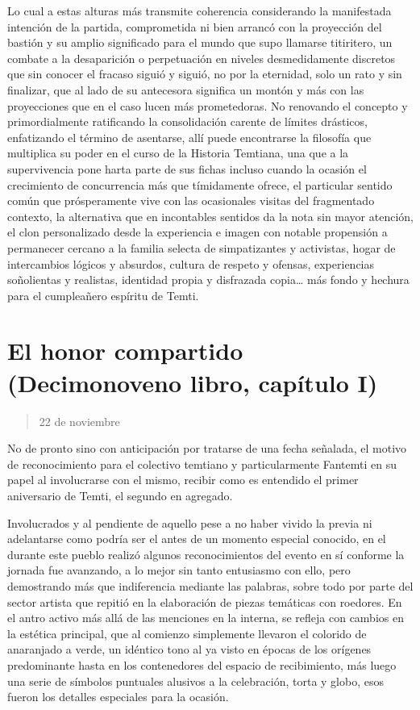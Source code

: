 \documentclass[
]{book}
\begin{document}
Lo cual a estas alturas más transmite coherencia considerando la manifestada intención de la partida, comprometida ni bien arrancó con la proyección del bastión y su amplio significado para el mundo que supo llamarse titiritero, un combate a la desaparición o perpetuación en niveles desmedidamente discretos que sin conocer el fracaso siguió y siguió, no por la eternidad, solo un rato y sin finalizar, que al lado de su antecesora significa un montón y más con las proyecciones que en el caso lucen más prometedoras. No renovando el concepto y primordialmente ratificando la consolidación carente de límites drásticos, enfatizando el término de asentarse, allí puede encontrarse la filosofía que multiplica su poder en el curso de la Historia Temtiana, una que a la supervivencia pone harta parte de sus fichas incluso cuando la ocasión el crecimiento de concurrencia más que tímidamente ofrece, el particular sentido común que prósperamente vive con las ocasionales visitas del fragmentado contexto, la alternativa que en incontables sentidos da la nota sin mayor atención, el clon personalizado desde la experiencia e imagen con notable propensión a permanecer cercano a la familia selecta de simpatizantes y activistas, hogar de intercambios lógicos y absurdos, cultura de respeto y ofensas, experiencias soñolientas y realistas, identidad propia y disfrazada copia\ldots{} más fondo y hechura para el cumpleañero espíritu de Temti.

\hypertarget{el-honor-compartido-decimonoveno-libro-capuxedtulo-i}{%
\section{El honor compartido (Decimonoveno libro, capítulo I)}\label{el-honor-compartido-decimonoveno-libro-capuxedtulo-i}}

\begin{quote}
22 de noviembre
\end{quote}

No de pronto sino con anticipación por tratarse de una fecha señalada, el motivo de reconocimiento para el colectivo temtiano y particularmente Fantemti en su papel al involucrarse con el mismo, recibir como es entendido el primer aniversario de Temti, el segundo en agregado.

Involucrados y al pendiente de aquello pese a no haber vivido la previa ni adelantarse como podría ser el antes de un momento especial conocido, en el durante este pueblo realizó algunos reconocimientos del evento en sí conforme la jornada fue avanzando, a lo mejor sin tanto entusiasmo con ello, pero demostrando más que indiferencia mediante las palabras, sobre todo por parte del sector artista que repitió en la elaboración de piezas temáticas con roedores. En el antro activo más allá de las menciones en la interna, se refleja con cambios en la estética principal, que al comienzo simplemente llevaron el colorido de anaranjado a verde, un idéntico tono al ya visto en épocas de los orígenes predominante hasta en los contenedores del espacio de recibimiento, más luego una serie de símbolos puntuales alusivos a la celebración, torta y globo, esos fueron los detalles especiales para la ocasión.
\end{document}
